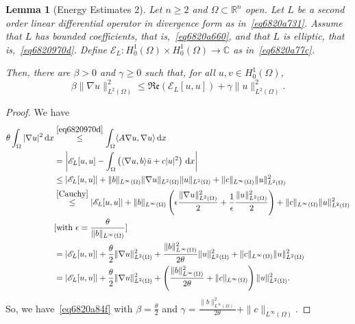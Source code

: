 \documentclass[a4paper,9pt]{amsart}
\newcommand{\scr}[1]{\mathscr{#1}}
\newcommand{\frk}[1]{\mathfrak{#1}}
\newcommand{\R}{\mathbb{R}}	%
\newcommand{\C}{\mathbb{C}}	%
\newcommand{\did}{\,\mathrm{d}}	%
\newcommand{\real}{\frk{Re}}
\newcommand{\grad}{\nabla}
\theoremstyle{plain}
\newtheorem{lemma}[proposition]{Lemma}
\theoremstyle{definition}
\theoremstyle{remark}
\begin{document}
\begin{lemma}[Energy Estimates 2]\label{lem6821a53c}
	Let $n\ge2$ and $\Omega\subset\R^n$ open.
	Let $L$ be a second order linear differential operator in divergence form as in~\eqref{eq6820a731}.
	Assume that $L$ has bounded coefficients, that is,~\eqref{eq6820a660},
	and that $L$ is elliptic, that is,~\eqref{eq6820970d}.
	Define $\scr E_L:H^1_0(\Omega)\times H^1_0(\Omega)\to\C$ as in~\eqref{eq6820a77c}.
	
	Then, there are $\beta>0$ and $\gamma\ge 0$ such that, for all $u,v\in H^1_0(\Omega)$,
	\begin{equation}\label{eq6820a84f}
		\beta \|\grad u\|_{L^2(\Omega)}^2 \le \real(\scr E_L[u,u]) + \gamma \|u\|_{L^2(\Omega)}^2 .
	\end{equation}
\end{lemma}
\begin{proof}
	We have
	\begin{align}
		\theta \int_\Omega |\grad u|^2 \did x
		&\overset{\eqref{eq6820970d}}\le \int_\Omega \langle A\grad u,\grad u \rangle \did x \\
		&= \left| \scr E_L[u,u] - \int_\Omega \left( \langle \grad u,b \rangle \bar u + c |u|^2 \right) \did x \right| \\
		&\le |\scr E_L[u,u]| 
			+ \|b\|_{L^\infty(\Omega)} \|\grad u\|_{L^2(\Omega)} \|u\|_{L^2(\Omega)} 
			+ \|c\|_{L^\infty(\Omega)} \|u\|_{L^2(\Omega)}^2 \\
		&\overset{\eqref{Cauchy}}\le |\scr E_L[u,u]| 
			+ \|b\|_{L^\infty(\Omega)} \left( \epsilon \frac{\|\grad u\|_{L^2(\Omega)}^2}{2} + \frac1\epsilon \frac{\|u\|_{L^2(\Omega)}^2}{2}  \right)
			+ \|c\|_{L^\infty(\Omega)} \|u\|_{L^2(\Omega)}^2 \\
	&[\text{with }\epsilon=\frac{\theta}{\|b\|_{L^\infty(\Omega)}}]\\
		&= |\scr E_L[u,u]| 
			+ \frac{\theta}{2} \|\grad u\|_{L^2(\Omega)}^2
			+ \frac{\|b\|_{L^\infty(\Omega)}^2}{2\theta} \|u\|_{L^2(\Omega)}^2
			+ \|c\|_{L^\infty(\Omega)} \|u\|_{L^2(\Omega)}^2 \\
		&= |\scr E_L[u,u]| 
			+ \frac{\theta}{2} \|\grad u\|_{L^2(\Omega)}^2
			+ \left( \frac{\|b\|_{L^\infty(\Omega)}^2}{2\theta}
			+ \|c\|_{L^\infty(\Omega)} \right)\|u\|_{L^2(\Omega)}^2 .
	\end{align}
	So, we have~\eqref{eq6820a84f} with $\beta = \frac{\theta}{2}$ and $\gamma = \frac{\|b\|_{L^\infty(\Omega)}^2}{2\theta} + \|c\|_{L^\infty(\Omega)}$.
\end{proof}
\end{document}
